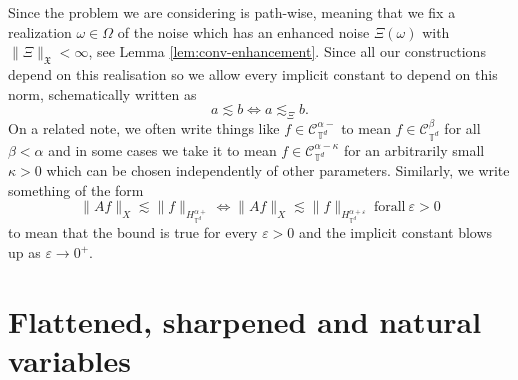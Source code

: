 Since the problem we are considering is path-wise, meaning that we
fix a realization $\omega \in \Omega$ of the noise which has an enhanced noise
$\Xi (\omega)$ with $\| \Xi \|_{\mathfrak{X}} < \infty $, see Lemma
\ref{lem:conv-enhancement}. Since all our constructions depend on this
realisation so we allow every implicit constant to depend on this
norm, schematically written as
\[ a \lesssim b \Leftrightarrow a \lesssim_{\Xi} b. \]
On a related note, we often write things like $f \in
\mathcal{C}_{\mathbb{T}^d}^{\alpha -}$ to mean $f \in
\mathcal{C}_{\mathbb{T}^d}^{\beta}$ for all $\beta < \alpha$ and in some cases
we take it to mean $f \in \mathcal{C}_{\mathbb{T}^d}^{\alpha - \kappa}$ for an
arbitrarily small $\kappa > 0$ which can be chosen independently of other
parameters. Similarly, we write something of the form
\[ \| A f \|_X \lesssim \| f \|_{H^{\alpha +}_{\mathbb{T}^d}} \Leftrightarrow
   \| A f \|_X \lesssim \| f \|_{H^{\alpha + \varepsilon}_{\mathbb{T}^d}} 
  \ \mathrm{for all} \ \varepsilon > 0 \]
to mean that the bound is true for every $\varepsilon > 0$ and the implicit
constant blows up as $\varepsilon \to 0^+.$

\section*{Flattened, sharpened and natural variables}

